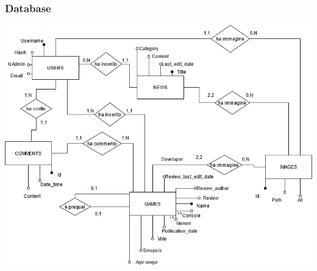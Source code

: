 \subsubsection{Database}


  \includegraphics[width=\linewidth]{./img/diagramma_er_ristrutturato.png}


